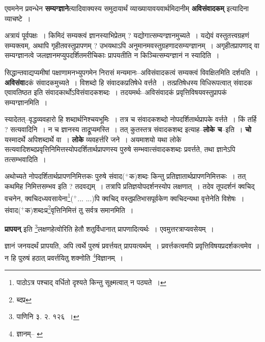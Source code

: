 \documentclass[article,12pt,a4paper]{memoir}
\newcommand{\add}[1]{($^{+}$#1)}
\begin{document}
	  \endgroup
	

	  \pstart एवमनेन प्रवन्धेन \textbf{सम्यग्ज्ञाने}त्यादिवाक्यस्य समुदायार्थं व्याख्यायावयवार्थमिदानीम् \textbf{अविसंवादकम्} इत्यादिना व्याचष्टे ।
	\pend
      

	  \pstart अत्रायं पूर्वपक्षः । किमिदं सम्यक्त्वं ज्ञानस्याभिप्रेतम् ? यद्योगात्सम्यग्ज्ञानमुच्यते । यद्येवं वस्तुतत्त्वग्रहणं सम्यक्त्वम्, अथापि गृहीतवस्तुप्रापणम् ? उभयथाऽपि अनुमानमवस्तुग्रहणादसम्यग्ज्ञानम् । अगृहीतप्रापणाद् वा सम्यग्ज्ञानत्वे जलज्ञानमप्युपदर्शितमरीचिकाः प्रापयतीति न किञ्चित्सम्यग्ज्ञानं न स्यादिति ।
	\pend
      

	  \pstart सिद्धान्तवाद्यप्यमीषां पक्षाणामनभ्युपगमेन निरासं मन्यमानः--अविसंवादकत्वं सम्यक्त्वं विवक्षितमिति \leavevmode{} दर्शयति । \textbf{अविसंवा}दकं संवादकमुच्यते । विशब्दो हि संवादकप्रतिषेधे वर्त्तते । तत्प्रतिषेधस्य विधिरूपत्वात् संवादक एवावतिष्ठत इति संवादकार्थोऽविसंवादकशब्दः । तदयमर्थः--अविसंवादकं प्रवृत्तिविषयवस्तुप्रापकं सम्यग्ज्ञानमिति ।
	\pend
      

	  \pstart स्यादेतत्--वृद्धव्यवहारो हि शब्दार्थनिश्चयभूमिः । तत्र च संवादकशब्दो नोपदर्शितार्थप्रापके वर्त्तते । किं तर्हि ? सत्यवादिनि । न च ज्ञानस्य ताद्रूप्यमस्ति । तत् कुतस्तत्र संवादकशब्द इत्याह--\textbf{लोके च}--इति । \textbf{चो} यस्मादर्थे अपिशब्दार्थे वा । \textbf{लोके} व्यवहर्त्तरि जने । अयमाशयो यथा लोके सत्यवादिशब्दप्रवृत्तिनिमित्तस्योपदर्शितार्थप्रापणस्य पुरुषे सम्भवात्संवादकशब्दः प्रवर्त्तते, तथा ज्ञानेऽपि तत्सम्भवादिति ।
	\pend
      

	  \pstart अथोच्यते नोपदर्शितार्थप्रापणनिमित्तकः पुरुषे संवाद\add{क}शब्दः किन्तु प्रतिज्ञातार्थप्रापणनिमित्तकः । तत् कथमिह निमित्तसम्भव इति ? तदवद्यम् । तत्रापि प्रतिज्ञयोपदर्शनस्योप लक्षणात् । तदेव तूपदर्शनं क्वचिद् वचनेन, क्वचिदध्यवसायेना\footnote{पाठोऽत्र पश्चाद् वर्धितो दृश्यते किन्तु सूक्ष्मत्वात् न पठ्यते ।}\add{... ...}पि क्वचिद् वस्तुप्रतिभासपूर्वकेण क्वचिदन्यथा वृत्तेनेति विशेषः । संवाद\add{क}शब्दःप्र\footnote{ब्दप्र}वृत्तिनिमित्तं तु सर्वत्र समानमिति ।
	\pend
      

	  \pstart \textbf{प्रापयन्} इति \footnote{पाणिनि ३. २. १२६ ।}लक्षणहेत्वोरिति हेतौ शतुर्विधानात् प्रापणादित्यर्थः । एवमुत्तरत्राप्यवसेयम् ।
	\pend
      \leavevmode{}
	  \bigskip
	  \begingroup
	

	  \pstart ज्ञानं जनयदर्थं प्रापयति, अपि त्वर्थे पुरुषं प्रवर्त्तयत् प्रापयत्यर्थम् । प्रवर्त्तकत्वमपि प्रवृत्तिविषयप्रदर्शकत्वमेव । न हि पुरुषं हठात् प्रवर्त्तयितु शक्नोति \footnote{ज्ञानम्--\cite{dp-msB} \cite{dp-edN}}विज्ञानम् ।
	\pend
      
\end{document}

